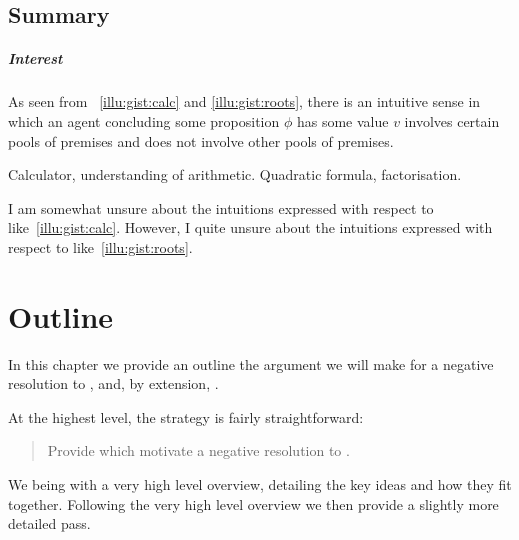 \section{Summary}

\paragraph*{Interest}

\begin{note}
  As seen from ~\ref{illu:gist:calc} and \ref{illu:gist:roots}, there is an intuitive sense in which an agent concluding some proposition \(\phi\) has some value \(v\) involves certain pools of premises and does not involve other pools of premises.

  Calculator, understanding of arithmetic.
  Quadratic formula, factorisation.

  I am somewhat unsure about the intuitions expressed with respect to  like~\autoref{illu:gist:calc}.
  However, I quite unsure about the intuitions expressed with respect to  like~\autoref{illu:gist:roots}.
\end{note}

\chapter{Outline}
\label{cha:outline}

\begin{note}
  In this chapter we provide an outline the argument we will make for a negative resolution to \issueConstraint{}, and, by extension, \issueInclusion{}.

  At the highest level, the strategy is fairly straightforward:
  \begin{quote}
    Provide  which motivate a negative resolution to \issueConstraint{}.
  \end{quote}

  We being with a very high level overview, detailing the key ideas and how they fit together.
  Following the very high level overview we then provide a slightly more detailed pass.
\end{note}

